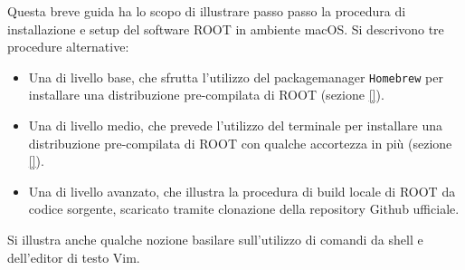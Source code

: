 Questa breve guida ha lo scopo di illustrare passo passo la procedura di installazione e setup del software ROOT in ambiente macOS. Si descrivono tre procedure alternative:
\begin{itemize}
    \item Una di livello base, che sfrutta l'utilizzo del packagemanager \texttt{Homebrew} per installare una distribuzione pre-compilata di ROOT (sezione \ref{}).
    \item Una di livello medio, che prevede l'utilizzo del terminale per installare una distribuzione pre-compilata di ROOT con qualche accortezza in più (sezione \ref{}).
    \item Una di livello avanzato, che illustra la procedura di build locale di ROOT da codice sorgente, scaricato tramite clonazione della repository Github ufficiale.
\end{itemize}
Si illustra anche qualche nozione basilare sull'utilizzo di comandi da shell e dell'editor di testo Vim.